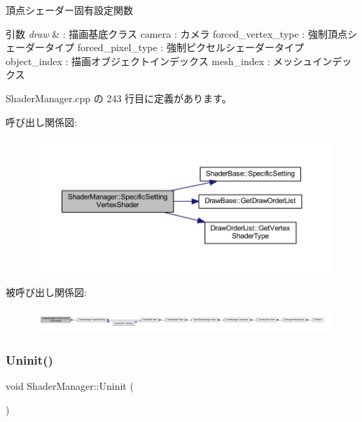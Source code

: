 頂点シェーダー固有設定関数 


\begin{DoxyParams}{引数}
{\em draw} & \+: 描画基底クラス camera \+: カメラ forced\+\_\+vertex\+\_\+type \+: 強制頂点シェーダータイプ forced\+\_\+pixel\+\_\+type \+: 強制ピクセルシェーダータイプ object\+\_\+index \+: 描画オブジェクトインデックス mesh\+\_\+index \+: メッシュインデックス \\
\hline
\end{DoxyParams}


 Shader\+Manager.\+cpp の 243 行目に定義があります。

呼び出し関係図\+:
\nopagebreak
\begin{figure}[H]
\begin{center}
\leavevmode
\includegraphics[width=350pt]{class_shader_manager_a2433c0715142fd310a497e080f7d0ddb_cgraph}
\end{center}
\end{figure}
被呼び出し関係図\+:
\nopagebreak
\begin{figure}[H]
\begin{center}
\leavevmode
\includegraphics[width=350pt]{class_shader_manager_a2433c0715142fd310a497e080f7d0ddb_icgraph}
\end{center}
\end{figure}
\mbox{\label{class_shader_manager_afc31a6bbe86e6b57edd7be0972f48ab1}} 
\subsubsection{\texorpdfstring{Uninit()}{Uninit()}}
{\footnotesize\ttfamily void Shader\+Manager\+::\+Uninit (\begin{DoxyParamCaption}{ }\end{DoxyParamCaption})}



